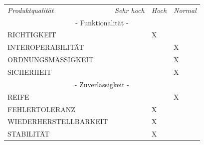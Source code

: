 \documentclass[a4paper]{scrreprt}
\begin{document}
    	\begin{table}[h!]
    		\centering
    		\begin{tabular}{llll}
    			\multicolumn{1}{l}{\textit{Produktqualität}}& \multicolumn{1}{c}{\textit{Sehr hoch}} & \multicolumn{1}{c}{\textit{Hoch}} & \multicolumn{1}{c}{\textit{Normal}}  \\
    			\multicolumn{4}{c}{- Funktionalität -} \\
    			RICHTIGKEIT                                  &                                        &    \hspace{6mm}               X               &                                      \\
    			INTEROPERABILITÄT                            &                                        &                                   &    \hspace{6mm}                     X               \\
    			ORDNUNGSMÄSSIGKEIT                           &                                        &                                   &    \hspace{6mm}                     X               \\
    			SICHERHEIT                                   &                                        &                                   &    \hspace{6mm}                     X               \\
    			\multicolumn{4}{c}{- Zuverlässigkeit -}\\
    			REIFE                                        &                                        &                                   &     \hspace{6mm}                    X               \\
    			FEHLERTOLERANZ                               &                                        &  \hspace{6mm}                    X               &                                      \\
    			WIEDERHERSTELLBARKEIT                        &                                        &   \hspace{6mm}                   X               &                                      \\
    			STABILITÄT                                   &                                        &  \hspace{6mm}                    X               &                                      \\

\end{tabular}
\end{table}
\end{document}
